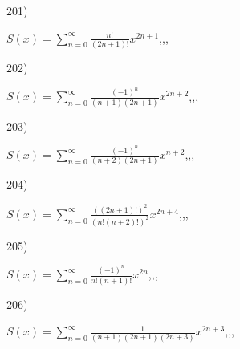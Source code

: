 \documentclass[11pt, ukrainian]{article}
\begin{document}
\par
\newpage
201) \space 
{%
{$S(x)=\sum\limits_{n=0}^{\infty}{\frac{n!}{(2n+1)!}}{x^{{2n+1}}}$},,, \par \smallskip  
}
\par
\vspace{0.9cm}
202) \space 
{%
{$S(x)=\sum\limits_{n=0}^{\infty}{\frac{(-1)^n}{(n+1)(2n+1)}}{x^{{2n+2}}}$},,, \par \smallskip  
}
\par
\vspace{0.9cm}
203) \space 
{%
{$S(x)=\sum\limits_{n=0}^{\infty}{\frac{(-1)^n}{(n+2)(2n+1)}}{x^{{n+2}}}$},,, \par \smallskip  
}
\par
\vspace{0.9cm}
204) \space 
{%
{$S(x)=\sum\limits_{n=0}^{\infty}{\frac{((2n+1)!)^2}{(n!(n+2)!)^2}}{x^{{2n+4}}}$},,, \par \smallskip  
}
\par
\vspace{0.9cm}
205) \space 
{%
{$S(x)=\sum\limits_{n=0}^{\infty}{\frac{(-1)^n}{n!(n+1)!}}{x^{{2n}}}$},,, \par \smallskip  
}
\par
\vspace{0.9cm}
206) \space 
{%
{$S(x)=\sum\limits_{n=0}^{\infty}{\frac{1}{(n+1)(2n+1)(2n+3)}}{x^{{2n+3}}}$},,, \par \smallskip  
}
\end{document}
